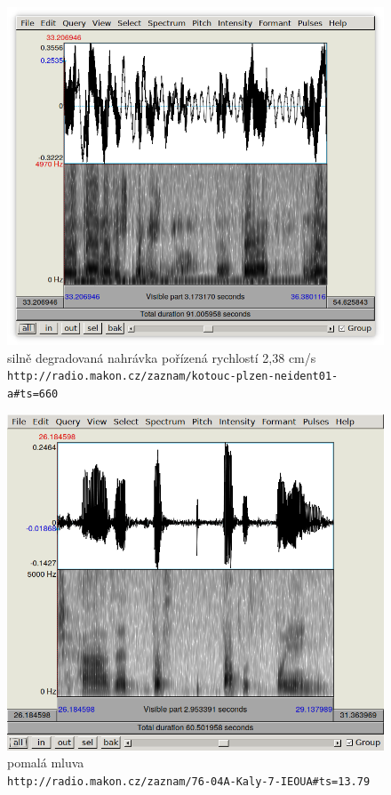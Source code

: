 \begin{figure}[htpb]
\includegraphics[scale=0.89]{rc/spectrum-2cms-ktplzneid01a.png}
\caption{
    silně degradovaná nahrávka pořízená rychlostí 2,38 cm/s\\
    \texttt{http://radio.makon.cz/zaznam/kotouc-plzen-neident01-a\#ts=660}
}
\label{fig:spectr-2cms}
\end{figure}

\begin{figure}[htpb]
\includegraphics[scale=0.89]{rc/spectrum-pomala-mluva-76-04A.png}
\caption{
    pomalá mluva\\
    \texttt{http://radio.makon.cz/zaznam/76-04A-Kaly-7-IEOUA\#ts=13.79}
}
\label{fig:spectr-slowtalk}
\end{figure}

